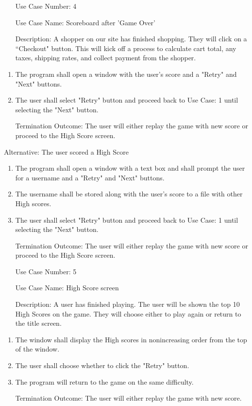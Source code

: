 \documentclass[10pt,conference,onecolumn,compsoc]{IEEEtran}
\begin{document}
\begin{itemize}
\item[Use Case Number:] 4
\item[Use Case Name:] Scoreboard after 'Game Over'
\item[Description:] A shopper on our site has finished shopping.  They will click on a ``Checkout" button.  This will kick off a process to calculate cart total, any taxes, shipping rates, and collect payment from the shopper.

\end{itemize}

\begin{enumerate}
\item The program shall open a window with the user's score and a "Retry" and "Next" buttons.
\item The user shall select "Retry" button and proceed back to Use Case: 1 until selecting the "Next" button.
\item[Termination Outcome:] The user will either replay the game with new score or proceed to the High Score screen.
\end{enumerate}

Alternative: The user scored a High Score
\begin{enumerate}
\item The program shall open a window with a text box and shall prompt the user for a username and a "Retry" and "Next" buttons.
\item The username shall be stored along with the user's score to a file with other High scores.
\item The user shall select "Retry" button and proceed back to Use Case: 1 until selecting the "Next" button.
\item[Termination Outcome:] The user will either replay the game with new score or proceed to the High Score screen.
\end{enumerate}


\begin{itemize}
\item[Use Case Number:] 5
\item[Use Case Name:] High Score screen
\item[Description:] A user has finished playing. The user will be shown the top 10 High Scores on the game. They will choose either to play again or return to the title screen.

\end{itemize}

\begin{enumerate}
\item The window shall display the High scores in nonincreasing order from the top of the window.
\item The user shall choose whether to click the "Retry" button.
\item The program will return to the game on the same difficulty.
\item[Termination Outcome:] The user will either replay the game with new score.
\end{enumerate}
\end{document}
